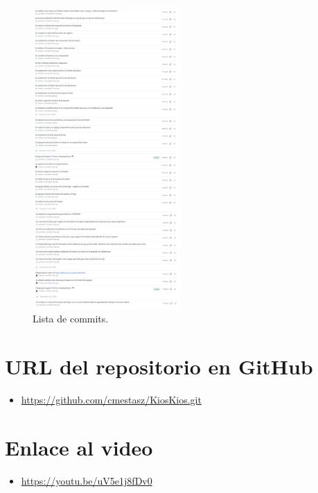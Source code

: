 \documentclass{article}
\begin{document}
\pagebreak
\begin{figure}[H]
	\centering
	\includegraphics[width=0.5\textwidth,keepaspectratio]{img/commits3.png}
	\caption{Lista de commits.}
\end{figure}
\pagebreak
\pagebreak

\section{URL del repositorio en GitHub}
\begin{itemize}
	\item \url{https://github.com/cmestasz/KiosKios.git}
\end{itemize}

\section{Enlace al video}
\begin{itemize}
	\item \url{https://youtu.be/uV5e1j8fDv0}
\end{itemize}
\end{document}
